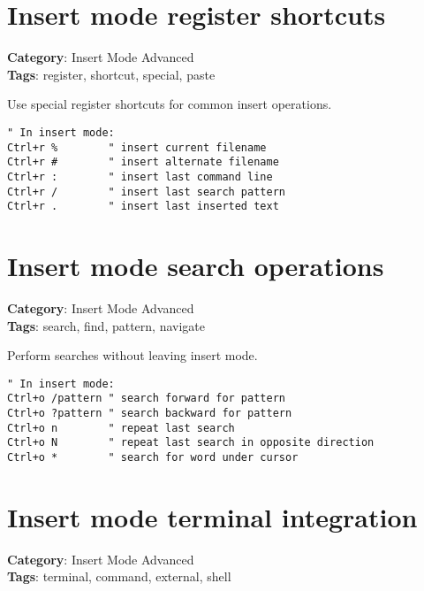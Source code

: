 {{{{{{\section{Insert mode register shortcuts}

\textbf{Category}: Insert Mode Advanced\\ \textbf{Tags}: register, shortcut, special, paste
\vspace{0.5cm}

Use special register shortcuts for common insert operations.

\begin{Exa*}{}
\begin{Verbatim}[fontsize=\footnotesize, breaklines, breakanywhere]
" In insert mode:
Ctrl+r %        " insert current filename
Ctrl+r #        " insert alternate filename
Ctrl+r :        " insert last command line
Ctrl+r /        " insert last search pattern
Ctrl+r .        " insert last inserted text
\end{Verbatim}
\end{Exa*}

\section{Insert mode search operations}

\textbf{Category}: Insert Mode Advanced\\ \textbf{Tags}: search, find, pattern, navigate
\vspace{0.5cm}

Perform searches without leaving insert mode.

\begin{Exa*}{}
\begin{Verbatim}[fontsize=\footnotesize, breaklines, breakanywhere]
" In insert mode:
Ctrl+o /pattern " search forward for pattern
Ctrl+o ?pattern " search backward for pattern
Ctrl+o n        " repeat last search
Ctrl+o N        " repeat last search in opposite direction
Ctrl+o *        " search for word under cursor
\end{Verbatim}
\end{Exa*}

\section{Insert mode terminal integration}

\textbf{Category}: Insert Mode Advanced\\ \textbf{Tags}: terminal, command, external, shell
\vspace{0.5cm}

}}}}}}
